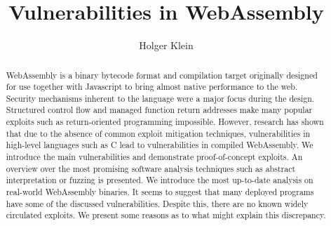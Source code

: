 \documentclass[sigconf]{acmart}
\begin{document}
\title{Vulnerabilities in WebAssembly}

\author{Holger Klein}


\renewcommand{\shortauthors}{Holger Klein}

\begin{abstract}
	WebAssembly is a binary bytecode format and compilation target originally designed for use together with Javascript to bring almost native performance to the web. Security mechanisms inherent to the language were a major focus during the design. Structured control flow and managed function return addresses make many popular exploits such as return-oriented programming impossible. However, research has shown that due to the absence of common exploit mitigation techniques, vulnerabilities in high-level languages such as C lead to vulnerabilities in compiled WebAssembly. We introduce the main vulnerabilities and demonstrate proof-of-concept exploits. An overview over the most promising software analysis techniques such as abstract interpretation or fuzzing is presented. We introduce the most up-to-date analysis on real-world WebAssembly binaries. It seems to suggest that many deployed programs have some of the discussed vulnerabilities. Despite this, there are no known widely circulated exploits. We present some reasons as to what might explain this discrepancy.
\end{abstract}
\end{document}
